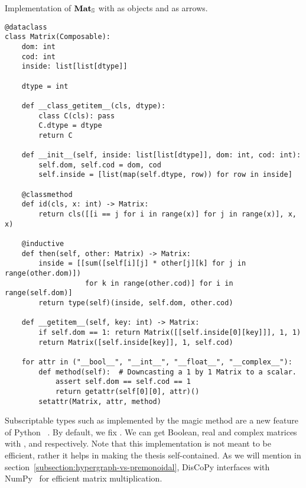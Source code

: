 \begin{python}\label{listing:matrix}
{\normalfont Implementation of $\mathbf{Mat}_\S$ with  as objects and  as arrows.}

\begin{verbatim}
@dataclass
class Matrix(Composable):
    dom: int
    cod: int
    inside: list[list[dtype]]

    dtype = int

    def __class_getitem__(cls, dtype):
        class C(cls): pass
        C.dtype = dtype
        return C

    def __init__(self, inside: list[list[dtype]], dom: int, cod: int):
        self.dom, self.cod = dom, cod
        self.inside = [list(map(self.dtype, row)) for row in inside]

    @classmethod
    def id(cls, x: int) -> Matrix:
        return cls([[i == j for i in range(x)] for j in range(x)], x, x)

    @inductive
    def then(self, other: Matrix) -> Matrix:
        inside = [[sum([self[i][j] * other[j][k] for j in range(other.dom)])
                   for k in range(other.cod)] for i in range(self.dom)]
        return type(self)(inside, self.dom, other.cod)

    def __getitem__(self, key: int) -> Matrix:
        if self.dom == 1: return Matrix([[self.inside[0][key]]], 1, 1)
        return Matrix([self.inside[key]], 1, self.cod)

    for attr in ("__bool__", "__int__", "__float__", "__complex__"):
        def method(self):  # Downcasting a 1 by 1 Matrix to a scalar.
            assert self.dom == self.cod == 1
            return getattr(self[0][0], attr)()
        setattr(Matrix, attr, method)
\end{verbatim}

Subscriptable types such as  implemented by the magic method  are a new feature of Python ~\cite{Levkivskyi17}.
By default, we fix .
We can get Boolean, real and complex matrices with ,  and  respectively.
Note that this implementation is not meant to be efficient, rather it helps in making the thesis self-contained.
As we will mention in section~\ref{subsection:hypergraph-vs-premonoidal}, DisCoPy interfaces with NumPy~\cite{VanDerWaltEtAl11} for efficient matrix multiplication.
\end{python}


